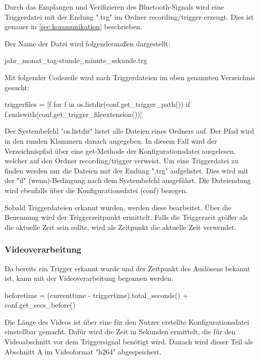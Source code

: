 Durch das Empfangen und Verifizieren des Bluetooth-Signals wird eine Triggerdatei mit der Endung ".trg" im Ordner recording/trigger erzeugt. Dies ist genauer in \ref{sec:kommunikation} beschrieben.

Der Name der Datei wird folgendermaßen dargestellt:
\begin{center}
	jahr_monat_tag-stunde_minute_sekunde.trg
\end{center}

Mit folgender Codezeile wird nach Triggerdateien im oben genannten Verzeichnis gesucht:

\begin{list}
triggerfiles = [f for f in os.listdir(conf.get_trigger_path()) if f.endswith(conf.get_trigger_fileextension())]
\end{list}

Der Systembefehl "os.listdir" listet alle Dateien eines Ordners auf. Der Pfad wird in den runden Klammern danach angegeben. In diesem Fall wird der Verzeichnispfad über eine get-Methode der Konfigurationsdatei ausgelesen, welcher auf den Ordner recording/trigger verweist. Um eine Triggerdatei zu finden werden nur die Dateien mit der Endung ".trg" aufgelistet. Dies wird mit der "if" (wenn)-Bedingung nach dem Systembefehl ausgeführt. Die Dateiendung wird ebenfalls über die Konfigurationsdatei (conf) bezogen.

Sobald Triggerdateien erkannt wurden, werden diese bearbeitet. Über die Benennung wird der Triggerzeitpunkt ermittelt. Falls die Triggerzeit größer als die aktuelle Zeit sein sollte, wird als Zeitpunkt die aktuelle Zeit verwendet.

\subsubsection{Videoverarbeitung}

Da bereits ein Trigger erkannt wurde und der Zeitpunkt des Auslösens bekannt ist, kann mit der Videoverarbeitung begonnen werden.

\begin{list}
beforetime = (currenttime - triggertime).total_seconds() + conf.get_secs_before()
\end{list}

Die Länge des Videos ist über eine für den Nutzer erstellte Konfigurationsdatei einstellbar gemacht. Dafür wird die Zeit in Sekunden ermittelt, die für den Videoabschnitt vor dem Triggersignal benötigt wird. Danach wird dieser Teil als Abschnitt A im Videoformat "h264" abgespeichert.

